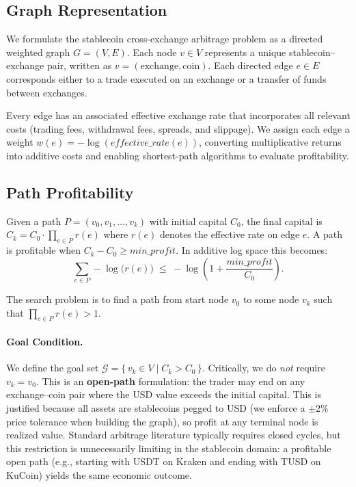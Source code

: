\subsection{Graph Representation}

We formulate the stablecoin cross-exchange arbitrage problem as a directed weighted graph
$G=(V,E)$. Each node $v\in V$ represents a unique stablecoin--exchange pair, written as
$v=(\text{exchange},\text{coin})$. Each directed edge $e\in E$ corresponds either to a trade executed on an
exchange or a transfer of funds between exchanges.

Every edge has an associated effective exchange rate that incorporates all relevant costs (trading fees, withdrawal fees, spreads, and slippage). We assign each edge a weight $w(e) = -\log(\textit{effective\_rate}(e))$, converting multiplicative returns into additive costs and enabling shortest-path algorithms to evaluate profitability.

\subsection{Path Profitability}

Given a path $P=(v_0,v_1,\dots,v_k)$ with initial capital $C_0$, the final capital is
$C_k = C_0 \cdot \prod_{e\in P} r(e)$
where $r(e)$ denotes the effective rate on edge $e$. A path is profitable when $C_k - C_0 \ge \textit{min\_profit}$. In additive log space this becomes:
\[
\sum_{e\in P} -\log\!\big(r(e)\big)
\;\le\;
-\log\!\left(1+\frac{\textit{min\_profit}}{C_0}\right).
\]

The search problem is to find a path from start node $v_0$ to some node $v_k$ such that $\prod_{e\in P} r(e) > 1$.

\paragraph{Goal Condition.}
We define the goal set $\mathcal{G} = \bigl\{\, v_k \in V \;\big|\; C_k > C_0 \,\bigr\}$.
Critically, we do \emph{not} require $v_k = v_0$. This is an \textbf{open-path} formulation: the trader may end on any exchange--coin pair where the USD value exceeds the initial capital. This is justified because all assets are stablecoins pegged to USD (we enforce a $\pm 2\%$ price tolerance when building the graph), so profit at any terminal node is realized value. Standard arbitrage literature typically requires closed cycles, but this restriction is unnecessarily limiting in the stablecoin domain: a profitable open path (e.g., starting with USDT on Kraken and ending with TUSD on KuCoin) yields the same economic outcome.

